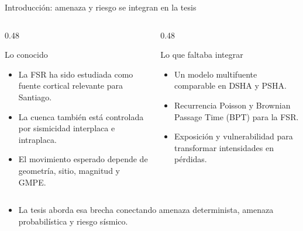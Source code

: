 \documentclass[aspectratio=169,10pt]{beamer}
\newcommand{\tightlist}{\setlength{\itemsep}{0.28em}}
\begin{document}
\begin{frame}[t]{Introducción: amenaza y riesgo se integran en la tesis}
\begin{columns}[T,onlytextwidth]
  \begin{column}{0.48\textwidth}
    \begin{block}{Lo conocido}
      \begin{itemize}\tightlist
        \item La FSR ha sido estudiada como fuente cortical relevante para Santiago.
        \item La cuenca también está controlada por sismicidad interplaca e intraplaca.
        \item El movimiento esperado depende de geometría, sitio, magnitud y GMPE.
      \end{itemize}
    \end{block}
  \end{column}
  \begin{column}{0.48\textwidth}
    \begin{block}{Lo que faltaba integrar}
      \begin{itemize}\tightlist
        \item Un modelo multifuente comparable en DSHA y PSHA.
        \item Recurrencia Poisson y Brownian Passage Time (BPT) para la FSR.
        \item Exposición y vulnerabilidad para transformar intensidades en pérdidas.
      \end{itemize}
    \end{block}
  \end{column}
\end{columns}
\vspace{0.45em}
\begin{itemize}\tightlist
  \item La tesis aborda esa brecha conectando amenaza determinista, amenaza probabilística y riesgo sísmico.
\end{itemize}
\end{frame}
\end{document}
